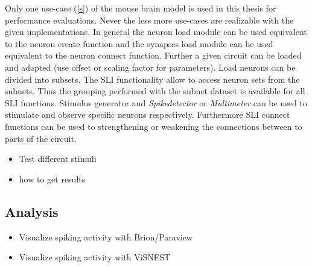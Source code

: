 Only one use-case (\ref{s}) of the mouse brain model is used in this thesis for performance evaluations.
Never the less more use-cases are realizable with the given implementations.
In general the neuron load module can be used equivalent to the neuron create function
and the synapses load module can be used equivalent to the neuron connect function.
Further a given circuit can be loaded and adapted (use offset or scaling factor for parameters).
Load neurons can be divided into subsets. The SLI functionality allow to access neuron sets
from the subnets. Thus the grouping performed with the subnet dataset is available for all SLI functions.
Stimulus generator and \emph{Spikedetector} or \emph{Multimeter} can be used to stimulate
and observe specific neurons respectively.
Furthermore SLI connect functions can be used to strengthening or weakening the connections between to
parts of the circuit.

\begin{itemize}
	  \item Test different stimuli
	  \item how to get results
\end{itemize}

\subsection{Analysis}
\begin{itemize}
	  \item Visualize spiking activity with Brion/Paraview
      \item Visualize spiking activity with ViSNEST
\end{itemize}